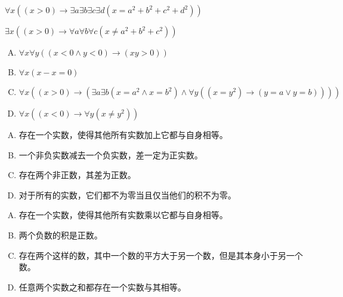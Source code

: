 {{        %
        \begin{practices}
            $\forall x ((x > 0) \rightarrow \exists a \exists b \exists c \exists d (x = a^2 + b^2 + c^2 + d^2))$
        \end{practices}

        \begin{practices}
            $\exists x ((x > 0) \rightarrow \forall a \forall b \forall c (x \neq a^2 + b^2 + c^2))$
        \end{practices}
        

        \begin{practices}
            \begin{enumerate}[A.]
                \item $\forall x \forall y ((x < 0 \wedge y < 0) \rightarrow (xy > 0))$
                \item $\forall x (x - x = 0)$
                \item $\forall x ((x > 0) \rightarrow (\exists a \exists b (x = a^2 \wedge x = b^2) \wedge \forall y ((x = y^2) \rightarrow (y = a \vee y = b))))$
                \item $\forall x ((x < 0) \rightarrow \forall y (x \neq y^2))$
            \end{enumerate}
        \end{practices}

        \begin{practices}
            \begin{enumerate}[A.]
                \item 存在一个实数，使得其他所有实数加上它都与自身相等。
                \item 一个非负实数减去一个负实数，差一定为正实数。
                \item 存在两个非正数，其差为正数。
                \item 对于所有的实数，它们都不为零当且仅当他们的积不为零。
            \end{enumerate}
        \end{practices}

        \begin{practices}
            \begin{enumerate}[A.]
                \item 存在一个实数，使得其他所有实数乘以它都与自身相等。
                \item 两个负数的积是正数。
                \item 存在两个这样的数，其中一个数的平方大于另一个数，但是其本身小于另一个数。
                \item 任意两个实数之和都存在一个实数与其相等。
            \end{enumerate}
        \end{practices}

}}
